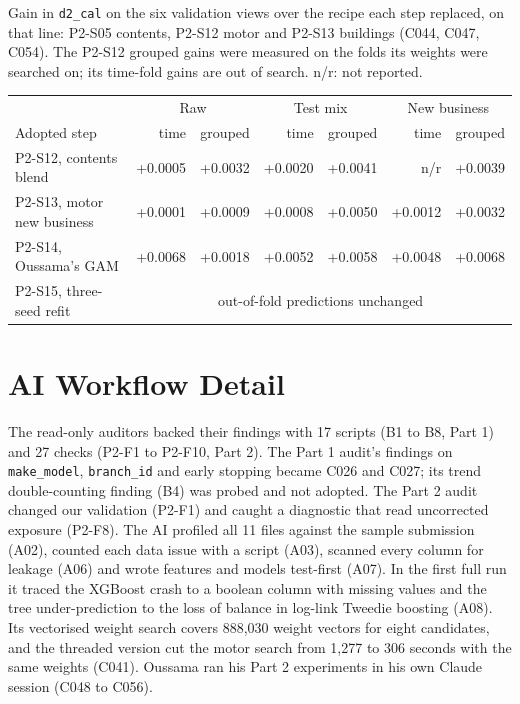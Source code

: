 \documentclass{rapport}
\begin{document}
Gain in \texttt{d2\_cal} on the six validation views over the recipe each step replaced, on that line: P2-S05
contents, P2-S12 motor and P2-S13 buildings (C044, C047, C054). The P2-S12 grouped gains were measured on the folds its
weights were searched on; its time-fold gains are out of search. n/r: not reported.

\begin{center}
\small
\begin{tabular}{lrrrrrr}
\hline
 & \multicolumn{2}{c}{Raw} & \multicolumn{2}{c}{Test mix} & \multicolumn{2}{c}{New business}\\
Adopted step & time & grouped & time & grouped & time & grouped\\
\hline
P2-S12, contents blend & +0.0005 & +0.0032 & +0.0020 & +0.0041 & n/r & +0.0039\\
P2-S13, motor new business & +0.0001 & +0.0009 & +0.0008 & +0.0050 & +0.0012 & +0.0032\\
P2-S14, Oussama's GAM & +0.0068 & +0.0018 & +0.0052 & +0.0058 & +0.0048 & +0.0068\\
P2-S15, three-seed refit & \multicolumn{6}{c}{out-of-fold predictions unchanged}\\
\hline
\end{tabular}
\end{center}

\section{AI Workflow Detail}
\label{ov:app-ai}

The read-only auditors backed their findings with 17 scripts (B1 to B8, Part 1) and 27 checks (P2-F1 to P2-F10,
Part 2). The Part 1 audit's findings on \texttt{make\_model}, \texttt{branch\_id} and early stopping became C026 and
C027; its trend double-counting finding (B4) was probed and not adopted. The Part 2 audit changed our validation
(P2-F1) and caught a diagnostic that read uncorrected exposure (P2-F8). The AI profiled all 11 files against the sample
submission (A02), counted each data issue with a script (A03), scanned every column for leakage (A06) and wrote
features and models test-first (A07). In the first full run it traced the XGBoost crash to a boolean column
with missing values and the tree under-prediction to the loss of balance in log-link Tweedie boosting (A08). Its
vectorised weight search covers 888,030 weight vectors for eight candidates,
and the threaded version cut the motor search from 1,277 to 306 seconds with the same weights (C041). Oussama ran his
Part 2 experiments in his own Claude session (C048 to C056).
\end{document}
